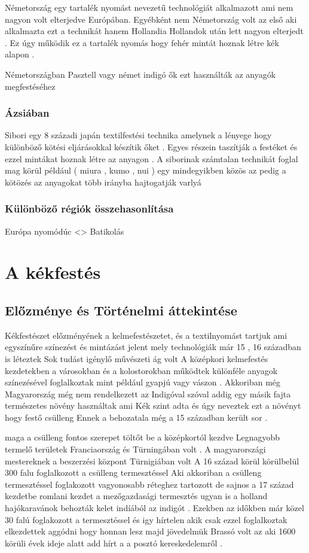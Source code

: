 \documentclass[fontsize=12pt, appendixprefix=true]{scrreprt}
\begin{document}
Németország egy  tartalék nyomást nevezetű technológiát  alkalmazott  ami  nem nagyon volt elterjedve Európában.
 Egyébként nem Németország volt az első aki alkalmazta  ezt a technikát  hanem Hollandia 
 Hollandok után  lett nagyon elterjedt .
 Ez úgy működik  ez a tartalék nyomás hogy fehér mintát hoznak létre  kék alapon .

 Németországban Pasztell vagy német indigó ők ezt használták az anyagók megfestéséhez 



\subsection{Ázsiában}
Sibori egy 8 századi japán textilfestési technika amelynek a lényege hogy különböző kötési eljárásokkal készítik őket .
Egyes részein taszítják a festéket és ezzel mintákat hoznak létre az anyagon .
A siborinak számtalan technikát foglal mag körül   például ( miura , kumo  , nui  ) egy mindegyikben közös az pedig a kötözés az anyagokat több irányba hajtogatják 
varlyá


\subsection{Különböző régiók összehasonlítása}
   Európa nyomódúc <> Batikolás
\chapter{A kékfestés}
\section{Előzménye és Történelmi áttekintése}
Kékfestészet előzményének a kelmefestészetet, és a textilnyomást tartjuk ami egyszínűre színezést és mintázást jelent  mely technológiák már 15 , 16 században is léteztek 
Sok tudást igénylő művészeti ág volt
A középkori kelmefestés kezdetekben a városokban és a kolostorokban működtek különféle anyagok színezésével foglalkoztak mint például gyapjú vagy vászon . 
Akkoriban még Magyarország még nem rendelkezett az Indigóval szóval addig egy másik fajta természetes növény használtak ami  Kék szint adta és úgy neveztek ezt a növényt hogy festő csülleng 
 Ennek a behozatala még a 15 században került sor .

 maga a csülleng fontos szerepet töltőt be a középkortól kezdve 
 Legnagyobb termelő területek Franciaország és Türningában volt .
 A magyarországi mestereknek a beszerzési központ Türnigiában volt 
 A 16 század körül körülbelül 300 falu foglalkozott a csülleng termesztéssel 
 Aki akkoriban a csülleng termesztéssel foglakozott vagyonosabb réteghez tartozott
 de sajnos a 17 század kezdetbe romlani kezdet a mezőgazdasági termesztés ugyan is a holland hajókaravánok behozták kelet indíából az indigót .
 Ezekben az időkben már közel 30 falú foglakozott a termesztéssel és igy hírtelen akik csak ezzel foglalkoztak elkezdettek aggódni hogy honnan lesz majd jövedelmük 
 Brassó volt az  aki 1600 körüli évek ideje alatt add hírt a a posztó kereskedelemről .
\end{document}
